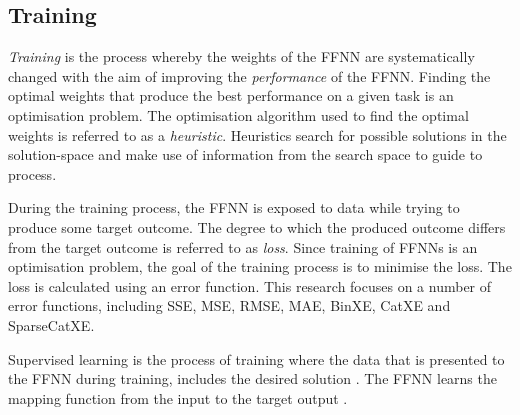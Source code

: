 \subsection{Training}
\label{sec:anns:training}

\textit{Training} is the process whereby the weights of the \acs{FFNN} are systematically changed with the aim of improving the \textit{performance} of the \acs{FFNN}. Finding the optimal weights that produce the best performance on a given task is an optimisation problem. The optimisation algorithm used to find the optimal weights is referred to as a \textit{heuristic}. Heuristics search for possible solutions in the solution-space and make use of information from the search space to guide to process.

During the training process, the \acs{FFNN} is exposed to data while trying to produce some target outcome. The degree to which the produced outcome differs from the target outcome is referred to as \textit{loss}. Since training of \acp{FFNN} is an optimisation problem, the goal of the training process is to minimise the loss. The loss is calculated using an error function. This research focuses on a number of error functions, including \acf{SSE}, \acf{MSE}, \acf{RMSE}, \acf{MAE}, \acf{BinXE}, \acf{CatXE} and \acf{SparseCatXE}.

Supervised learning is the process of training where the data that is presented to the \acs{FFNN} during training, includes the desired solution  \cite{ref:geron:2017}. The \acs{FFNN} learns the mapping function from the input to the target output  \cite{ref:brownlee:2016}.
